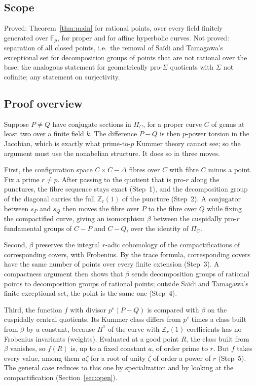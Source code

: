 \documentclass[11pt]{amsart}
\theoremstyle{remark}
\newcommand{\Z}{\mathbb Z}
\newcommand{\F}{\mathbb F}
\begin{document}
\subsection{Scope}
Proved: Theorem~\ref{thm:main} for rational points, over every field finitely generated over $\F_p$, for proper and for affine hyperbolic curves. Not proved: separation of all closed points, i.e.\ the removal of Sa\"idi and Tamagawa's exceptional set for decomposition groups of points that are not rational over the base; the analogous statement for geometrically pro-$\Sigma$ quotients with $\Sigma$ not cofinite; any statement on surjectivity.

\subsection{Proof overview}
Suppose $P\ne Q$ have conjugate sections in $\Pi_C$, for a proper curve $C$ of genus at least two over a finite field $k$. The difference $P-Q$ is then $p$-power torsion in the Jacobian, which is exactly what prime-to-$p$ Kummer theory cannot see; so the argument must use the nonabelian structure. It does so in three moves.

First, the configuration space $C\times C-\Delta$ fibres over $C$ with fibre $C$ minus a point. Fix a prime $r\ne p$. After passing to the quotient that is pro-$r$ along the punctures, the fibre sequence stays exact (Step~1), and the decomposition group of the diagonal carries the full $\Z_r(1)$ of the puncture (Step~2). A conjugator between $s_P$ and $s_Q$ then moves the fibre over $P$ to the fibre over $Q$ while fixing the compactified curve, giving an isomorphism $\beta$ between the cuspidally pro-$r$ fundamental groups of $C-P$ and $C-Q$, over the identity of $\Pi_C$.

Second, $\beta$ preserves the integral $r$-adic cohomology of the compactifications of corresponding covers, with Frobenius. By the trace formula, corresponding covers have the same number of points over every finite extension (Step~3). A compactness argument then shows that $\beta$ sends decomposition groups of rational points to decomposition groups of rational points; outside Sa\"idi and Tamagawa's finite exceptional set, the point is the same one (Step~4).

Third, the function $f$ with divisor $p^e(P-Q)$ is compared with $\beta$ on the cuspidally central quotients. Its Kummer class differs from $p^e$ times a class built from $\beta$ by a constant, because $H^1$ of the curve with $\Z_r(1)$ coefficients has no Frobenius invariants (weights). Evaluated at a good point $R$, the class built from $\beta$ vanishes, so $f(R)$ is, up to a fixed constant $a$, of order prime to $r$. But $f$ takes every value, among them $a\zeta$ for a root of unity $\zeta$ of order a power of $r$ (Step~5). The general case reduces to this one by specialization and by looking at the compactification (Section~\ref{sec:open}).
\end{document}
